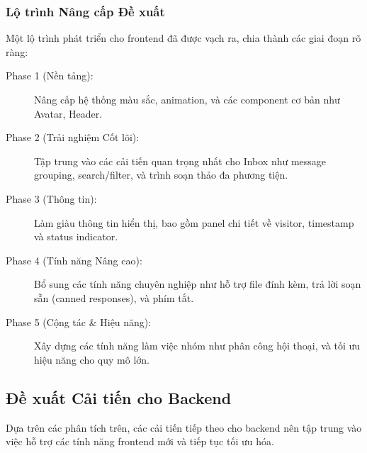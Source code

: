 \subsubsection{Lộ trình Nâng cấp Đề xuất}
Một lộ trình phát triển cho frontend đã được vạch ra, chia thành các giai đoạn rõ ràng:
\begin{description}
    \item[Phase 1 (Nền tảng):] Nâng cấp hệ thống màu sắc, animation, và các component cơ bản như Avatar, Header.
    \item[Phase 2 (Trải nghiệm Cốt lõi):] Tập trung vào các cải tiến quan trọng nhất cho Inbox như message grouping, search/filter, và trình soạn thảo đa phương tiện.
    \item[Phase 3 (Thông tin):] Làm giàu thông tin hiển thị, bao gồm panel chi tiết về visitor, timestamp và status indicator.
    \item[Phase 4 (Tính năng Nâng cao):] Bổ sung các tính năng chuyên nghiệp như hỗ trợ file đính kèm, trả lời soạn sẵn (canned responses), và phím tắt.
    \item[Phase 5 (Cộng tác \& Hiệu năng):] Xây dựng các tính năng làm việc nhóm như phân công hội thoại, và tối ưu hiệu năng cho quy mô lớn.
\end{description}

\subsection{Đề xuất Cải tiến cho Backend}
\label{subsec:future-improvements}

Dựa trên các phân tích trên, các cải tiến tiếp theo cho backend nên tập trung vào việc hỗ trợ các tính năng frontend mới và tiếp tục tối ưu hóa.

